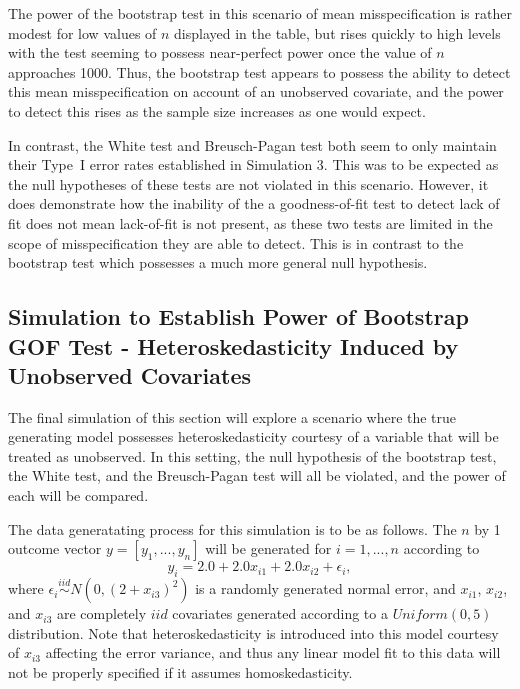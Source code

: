 		The power of the bootstrap test in this scenario of mean misspecification is rather modest for low values of $n$ displayed in the table, but rises quickly to high levels
		with the test seeming to possess near-perfect power once the value of $n$ approaches 1000. Thus, the bootstrap test appears to possess the ability to detect this mean
		misspecification on account of an unobserved covariate, and the power to detect this rises as the sample size increases as one would expect.

		In contrast, the White test and Breusch-Pagan test both seem to only maintain their Type~I error rates established in Simulation 3. This was to be expected
		as the null hypotheses of these tests are not violated in this scenario. However, it does demonstrate how the inability of the a goodness-of-fit test to detect lack of
		fit does not mean lack-of-fit is not present, as these two tests are limited in the scope of misspecification they are able to detect. This is in contrast to the
		bootstrap test which possesses a much more general null hypothesis.

		\subsection{Simulation to Establish Power of Bootstrap GOF Test - Heteroskedasticity Induced by Unobserved Covariates}

		The final simulation of this section will explore a scenario where the true generating model possesses heteroskedasticity courtesy of a variable that will be
		treated as unobserved. In this setting, the null hypothesis of the bootstrap test, the White test, and the Breusch-Pagan test will all be violated, and the
		power of each will be compared.

		The data generatating process for this simulation is to be as follows. The $n$ by 1 outcome vector $y = [y_1,...,y_n]$ will be generated for $i = 1,...,n$ according
		to
		\begin{equation}
			y_i = 2.0 + 2.0 x_{i1} + 2.0 x_{i2} + \epsilon_i , 
		\end{equation}
		where $\epsilon_i \stackrel{iid}{\sim} N \left( 0,(2 + x_{i3})^2 \right)$ is a randomly generated normal error, and $x_{i1}$, $x_{i2}$, and $x_{i3}$ are completely $iid$ covariates
		generated according to a $Uniform(0,5)$ distribution. Note that heteroskedasticity is introduced into this model courtesy of $x_{i3}$ affecting the error variance, and thus any
		linear model fit to this data will not be properly specified if it assumes homoskedasticity.
		
